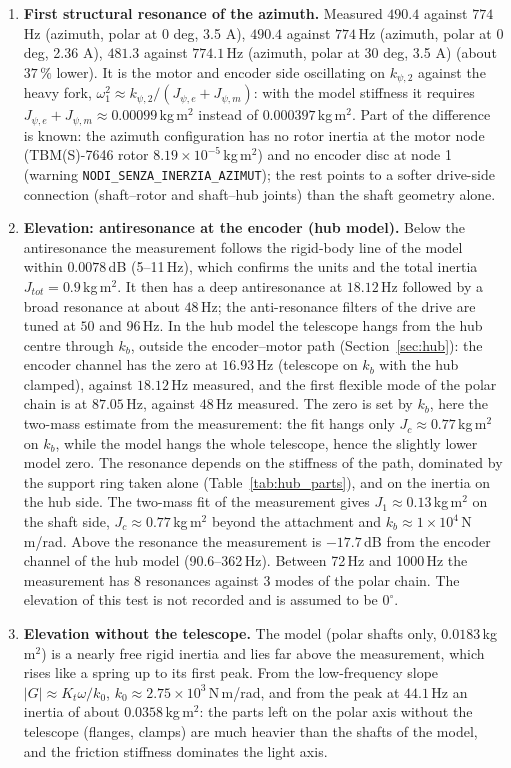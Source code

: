 \documentclass[10pt,a4paper]{article}
\numberwithin{equation}{section}
\begin{document}
\begin{enumerate}
\item \textbf{First structural resonance of the azimuth.} Measured $490.4$ against $774$\,Hz (azimuth, polar at 0 deg, 3.5 A), $490.4$ against $774$\,Hz (azimuth, polar at 0 deg, 2.36 A), $481.3$ against $774.1$\,Hz (azimuth, polar at 30 deg, 3.5 A) (about $37\,\%$ lower). It is the motor and encoder side oscillating on $k_{\psi,2}$ against the heavy fork, $\omega_1^2\approx k_{\psi,2}/(J_{\psi,e} + J_{\psi,m})$: with the model stiffness it requires $J_{\psi,e} + J_{\psi,m} \approx 0.00099$\,kg\,m$^2$ instead of $0.000397$\,kg\,m$^2$. Part of the difference is known: the azimuth configuration has no rotor inertia at the motor node (TBM(S)-7646 rotor $8.19\times10^{-5}$\,kg\,m$^2$) and no encoder disc at node 1 (warning \texttt{NODI\_SENZA\_INERZIA\_AZIMUT}); the rest points to a softer drive-side connection (shaft--rotor and shaft--hub joints) than the shaft geometry alone.
\item \textbf{Elevation: antiresonance at the encoder (hub model).} Below the antiresonance the measurement follows the rigid-body line of the model within $0.0078$\,dB (5--11\,Hz), which confirms the units and the total inertia $J_{tot} = 0.9$\,kg\,m$^2$. It then has a deep antiresonance at $18.12$\,Hz followed by a broad resonance at about $48$\,Hz; the anti-resonance filters of the drive are tuned at $50$ and $96$\,Hz. In the hub model the telescope hangs from the hub centre through $k_b$, outside the encoder--motor path (Section~\ref{sec:hub}): the encoder channel has the zero at $16.93$\,Hz (telescope on $k_b$ with the hub clamped), against $18.12$\,Hz measured, and the first flexible mode of the polar chain is at $87.05$\,Hz, against $48$\,Hz measured. The zero is set by $k_b$, here the two-mass estimate from the measurement: the fit hangs only $J_c \approx 0.77$\,kg\,m$^2$ on $k_b$, while the model hangs the whole telescope, hence the slightly lower model zero. The resonance depends on the stiffness of the path, dominated by the support ring taken alone (Table~\ref{tab:hub_parts}), and on the inertia on the hub side. The two-mass fit of the measurement gives $J_1 \approx 0.13$\,kg\,m$^2$ on the shaft side, $J_c \approx 0.77$\,kg\,m$^2$ beyond the attachment and $k_b \approx 1\times10^{4}$\,N\,m/rad. Above the resonance the measurement is $-17.7$\,dB from the encoder channel of the hub model (90.6--362\,Hz). Between 72\,Hz and 1000\,Hz the measurement has 8 resonances against 3 modes of the polar chain. The elevation of this test is not recorded and is assumed to be $0^\circ$.
\item \textbf{Elevation without the telescope.} The model (polar shafts only, $0.0183$\,kg\,m$^2$) is a nearly free rigid inertia and lies far above the measurement, which rises like a spring up to its first peak. From the low-frequency slope $|G| \approx K_t\omega/k_0$, $k_0 \approx 2.75\times10^{3}$\,N\,m/rad, and from the peak at $44.1$\,Hz an inertia of about $0.0358$\,kg\,m$^2$: the parts left on the polar axis without the telescope (flanges, clamps) are much heavier than the shafts of the model, and the friction stiffness dominates the light axis.

\end{enumerate}
\end{document}

